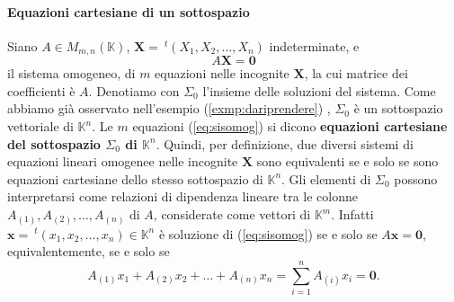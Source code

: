 \documentclass{article}
\theoremstyle{plain}
\theoremstyle{definition}
\theoremstyle{remark}
\begin{document}
\vspace{10pt}

\paragraph{Equazioni cartesiane di un sottospazio}
Siano \( A \in M_{m,n}(\mathbb{K}) \), \( \mathbf{X} = \ ^{t}(X_1, X_2, \ldots, X_n) \) indeterminate, e
\begin{equation}
    A\mathbf{X} = \mathbf{0}\label{eq:sisomog} 
\end{equation}
il sistema omogeneo, di \( m \) equazioni nelle incognite \( \mathbf{X} \), la cui matrice dei coefficienti è \( A \).
Denotiamo con \( \Sigma_0 \) l'insieme delle soluzioni del sistema. 
Come abbiamo già osservato nell'esempio (\ref{exmp:dariprendere}) , \( \Sigma_0 \) è un sottospazio vettoriale di \( \mathbb{K}^n \). 
Le \( m \) equazioni (\ref{eq:sisomog}) si dicono \textbf{equazioni cartesiane del sottospazio $\Sigma_0$ di $\mathbb{K}^n$}.
Quindi, per definizione, due diversi sistemi di equazioni lineari omogenee nelle incognite \( \mathbf{X} \) sono equivalenti se e solo se sono equazioni cartesiane dello stesso sottospazio di \( \mathbb{K}^n \). 
Gli elementi di \( \Sigma_0 \) possono interpretarsi come relazioni di dipendenza lineare tra le colonne \( A_{(1)}, A_{(2)}, \ldots, A_{(n)} \) di \( A \), considerate come vettori di \( \mathbb{K}^m \). 
Infatti \( \mathbf{x} = \ ^{t}(x_1, x_2, \ldots, x_n) \in \mathbb{K}^n \) è soluzione di (\ref{eq:sisomog}) se e solo se \( A\mathbf{x} = \mathbf{0} \), equivalentemente, se e solo se
\[  A_{(1)}x_1 + A_{(2)}x_2 + \ldots + A_{(n)}x_n = \sum_{i=1}^{n}A_{(i)}x_i = \mathbf{0}.\]


\vspace{10pt}
\end{document}
